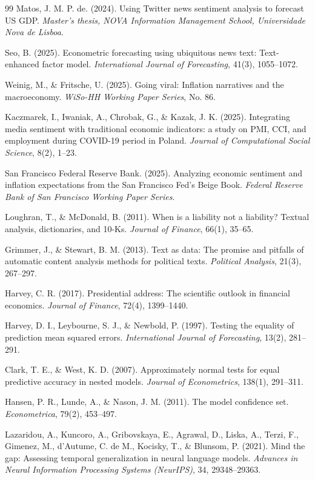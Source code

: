 \documentclass[11pt,twocolumn]{article}
\begin{document}
\begin{thebibliography}{99}
 Matos, J. M. P. de. (2024). Using Twitter news sentiment analysis to forecast US GDP. \textit{Master's thesis, NOVA Information Management School, Universidade Nova de Lisboa}.

 Seo, B. (2025). Econometric forecasting using ubiquitous news text: Text-enhanced factor model. \textit{International Journal of Forecasting}, 41(3), 1055--1072.

 Weinig, M., \& Fritsche, U. (2025). Going viral: Inflation narratives and the macroeconomy. \textit{WiSo-HH Working Paper Series}, No. 86.

 Kaczmarek, I., Iwaniak, A., Chrobak, G., \& Kazak, J. K. (2025). Integrating media sentiment with traditional economic indicators: a study on PMI, CCI, and employment during COVID-19 period in Poland. \textit{Journal of Computational Social Science}, 8(2), 1--23.

 San Francisco Federal Reserve Bank. (2025). Analyzing economic sentiment and inflation expectations from the San Francisco Fed's Beige Book. \textit{Federal Reserve Bank of San Francisco Working Paper Series}.

 Loughran, T., \& McDonald, B. (2011). When is a liability not a liability? Textual analysis, dictionaries, and 10-Ks. \textit{Journal of Finance}, 66(1), 35--65.

 Grimmer, J., \& Stewart, B. M. (2013). Text as data: The promise and pitfalls of automatic content analysis methods for political texts. \textit{Political Analysis}, 21(3), 267--297.

 Harvey, C. R. (2017). Presidential address: The scientific outlook in financial economics. \textit{Journal of Finance}, 72(4), 1399--1440.

 Harvey, D. I., Leybourne, S. J., \& Newbold, P. (1997). Testing the equality of prediction mean squared errors. \textit{International Journal of Forecasting}, 13(2), 281--291.

 Clark, T. E., \& West, K. D. (2007). Approximately normal tests for equal predictive accuracy in nested models. \textit{Journal of Econometrics}, 138(1), 291--311.

 Hansen, P. R., Lunde, A., \& Nason, J. M. (2011). The model confidence set. \textit{Econometrica}, 79(2), 453--497.

 Lazaridou, A., Kuncoro, A., Gribovskaya, E., Agrawal, D., Liska, A., Terzi, F., Gimenez, M., d'Autume, C. de M., Kocisky, T., \& Blunsom, P. (2021). Mind the gap: Assessing temporal generalization in neural language models. \textit{Advances in Neural Information Processing Systems (NeurIPS)}, 34, 29348--29363.


\end{thebibliography}
\end{document}
